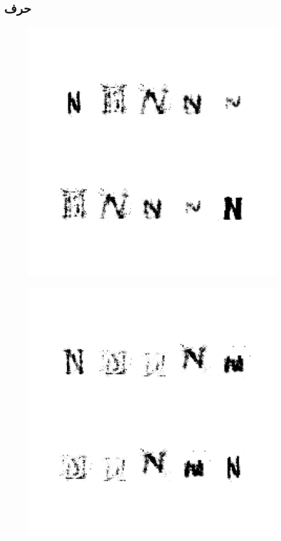\documentclass{article}
\begin{document}
\subsection{حرف }
\begin{figure}[H]
	\centerline{\includegraphics[width=\textwidth , height=\textheight ]{../results/CGAN_Adam/figs/letters/N/95.pdf}}
\end{figure}
\begin{figure}[H]
	\centerline{\includegraphics[width=\textwidth , height=\textheight ]{../results/CGAN_Adam/figs/letters/N/90.pdf}}
\end{figure}
\end{document}
